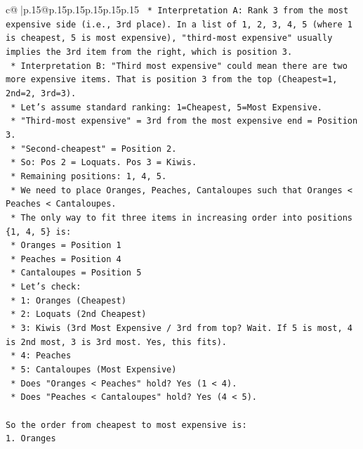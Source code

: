 \documentclass{article}
\begin{document}
{\begin{supertabular}{c@{$\;$}|p{.15\linewidth}@{}p{.15\linewidth}p{.15\linewidth}p{.15\linewidth}p{.15\linewidth}p{.15\linewidth}}
{{{\texttt{    *   Interpretation A: Rank 3 from the most expensive side (i.e., 3rd place). In a list of 1, 2, 3, 4, 5 (where 1 is cheapest, 5 is most expensive), "third{-}most expensive" usually implies the 3rd item from the right, which is position 3.} \\
\texttt{    *   Interpretation B: "Third most expensive" could mean there are two more expensive items. That is position 3 from the top (Cheapest=1, 2nd=2, 3rd=3).} \\
\texttt{    *   Let's assume standard ranking: 1=Cheapest, 5=Most Expensive.} \\
\texttt{    *   "Third{-}most expensive" = 3rd from the most expensive end = Position 3.} \\
\texttt{    *   "Second{-}cheapest" = Position 2.} \\
\texttt{    *   So: Pos 2 = Loquats. Pos 3 = Kiwis.} \\
\texttt{    *   Remaining positions: 1, 4, 5.} \\
\texttt{    *   We need to place Oranges, Peaches, Cantaloupes such that Oranges < Peaches < Cantaloupes.} \\
\texttt{    *   The only way to fit three items in increasing order into positions \{1, 4, 5\} is:} \\
\texttt{        *   Oranges = Position 1} \\
\texttt{        *   Peaches = Position 4} \\
\texttt{        *   Cantaloupes = Position 5} \\
\texttt{    *   Let's check:} \\
\texttt{        *   1: Oranges (Cheapest)} \\
\texttt{        *   2: Loquats (2nd Cheapest)} \\
\texttt{        *   3: Kiwis (3rd Most Expensive / 3rd from top? Wait. If 5 is most, 4 is 2nd most, 3 is 3rd most. Yes, this fits).} \\
\texttt{        *   4: Peaches} \\
\texttt{        *   5: Cantaloupes (Most Expensive)} \\
\texttt{    *   Does "Oranges < Peaches" hold? Yes (1 < 4).} \\
\texttt{    *   Does "Peaches < Cantaloupes" hold? Yes (4 < 5).} \\
\\ 
\texttt{So the order from cheapest to most expensive is:} \\
\texttt{1.  Oranges} \\
}}}
\end{supertabular}}
\end{document}
